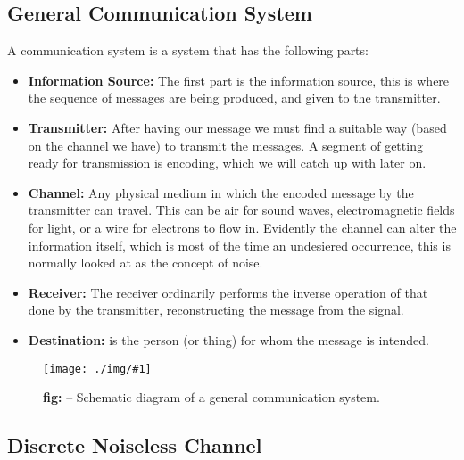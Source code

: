 \documentclass[10pt,a4paper]{article}
\newcounter{figurecounter}
\newcommand{\img}[3]{
    \begin{figure}[h!]
        \centering
        \captionsetup{justification=centering,margin=0cm,labelformat=empty}
        \texttt{[image: ./img/\#1]}
        \label{figure}
        \caption{\small\textbf{fig: \thefigurecounter} -- \textcolor{darkliver}{#3}}
    \end{figure}
    \addtocounter{figurecounter}{1}}
\begin{document}
        \subsection{General Communication System}
            \indent A communication system  is a system that has the following parts:
            \begin{itemize}
                \item \textbf{Information Source:} The first part is the information source, this is where the sequence of messages are being produced, and given to the transmitter.
                \item \textbf{Transmitter:} After having our message we must find a suitable way (based on the channel we have) to transmit the messages. A segment of getting ready for transmission is encoding, which we will catch up with later on.
                \item \textbf{Channel:} Any physical medium in which the encoded message by the transmitter can travel. This can be air for sound waves, electromagnetic fields for light, or a wire for electrons to flow in. Evidently the channel can alter the information itself, which is most of the time an undesiered occurrence, this is normally looked at as the concept of noise.
                \item \textbf{Receiver:} The receiver ordinarily performs the inverse operation of that done by the transmitter, reconstructing the message from the signal.
                \item \textbf{Destination:} is the person (or thing) for whom the message is intended.
            \end{itemize}
            \img{sch-generalcommunicationsystem}{0.7}{Schematic diagram of a general communication system.}

        \subsection{Discrete Noiseless Channel}
\end{document}
